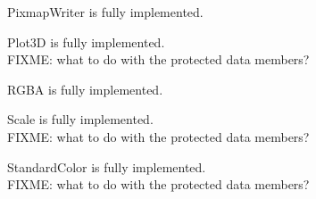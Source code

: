 \documentclass{manual}
\begin{document}
\begin{classdesc*}{PixmapWriter}
  is fully implemented.
\end{classdesc*}

\begin{classdesc*}{Plot3D}
  is fully implemented.\\
  FIXME: what to do with the protected data members?\\
\end{classdesc*}

\begin{classdesc*}{RGBA}
  is fully implemented.
\end{classdesc*}

\begin{classdesc*}{Scale}
  is fully implemented.\\
  FIXME: what to do with the protected data members?
\end{classdesc*}

\begin{classdesc*}{StandardColor}
  is fully implemented.\\
  FIXME: what to do with the protected data members?
\end{classdesc*}
\end{document}
